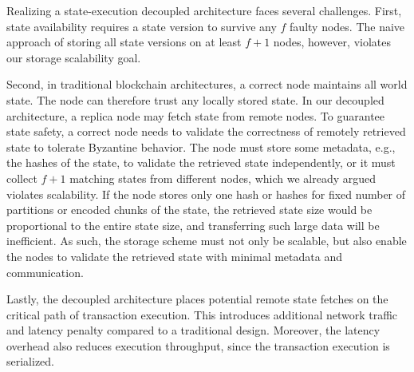 Realizing a state-execution decoupled architecture faces several challenges.
First, state availability requires a state version to survive any $f$ faulty nodes.
The naive approach of storing all state versions on at least $f+1$ nodes, however, violates our storage scalability goal.

Second, in traditional blockchain architectures, a correct node maintains all world state.
The node can therefore trust any locally stored state.
In our decoupled architecture, a replica node may fetch state from remote nodes.
To guarantee state safety, a correct node needs to validate the correctness of remotely retrieved state to tolerate Byzantine behavior.
The node must store some metadata, e.g., the hashes of the state, to validate the retrieved state independently, or it must collect $f+1$ matching states from different nodes, which we already argued violates scalability.
If the node stores only one hash or hashes for fixed number of partitions or encoded chunks of the state, the retrieved state size would be proportional to the entire state size, and transferring such large data will be inefficient.
As such, the storage scheme must not only be scalable, but also enable the nodes to validate the retrieved state with minimal metadata and communication.

Lastly, the decoupled architecture places potential remote state fetches on the critical path of transaction execution.
This introduces additional network traffic and latency penalty compared to a traditional design.
Moreover, the latency overhead also reduces execution throughput, since the transaction execution is serialized.



